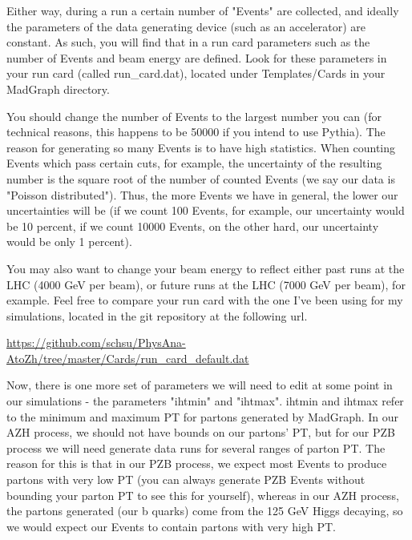 \documentclass{article}
\begin{document}
\bigskip

Either way, during a run a certain number of "Events" are collected, and ideally the parameters of the data generating device (such as
an accelerator) are constant. As such, you will find that in a run card parameters such as the number of Events and beam energy are defined.
Look for these parameters in your run card (called run\_card.dat), located under Templates/Cards in your MadGraph directory.

\bigskip

You should change the number of Events to the largest number you can (for technical reasons, this happens to be 50000 if you intend to use Pythia).
The reason for generating so many Events is to have high statistics. When counting Events which pass certain cuts, for example, the uncertainty of
the resulting number is the square root of the number of counted Events (we say our data is "Poisson distributed"). Thus, the more Events we have
in general, the lower our uncertainties will be (if we count 100 Events, for example, our uncertainty would be 10 percent, if we count 10000 Events,
on the other hard, our uncertainty would be only 1 percent).

\bigskip

You may also want to change your beam energy to reflect either past runs at the LHC (4000 GeV per beam), or future runs at the LHC (7000 GeV per beam), for example.
Feel free to compare your run card with the one I've been using for my simulations, located in the git repository at the following url.

\bigskip

\url{https://github.com/schsu/PhysAna-AtoZh/tree/master/Cards/run_card_default.dat}

\bigskip

Now, there is one more set of parameters we will need to edit at some point in our simulations - the parameters "ihtmin" and "ihtmax".
ihtmin and ihtmax refer to the minimum and maximum PT for partons generated by MadGraph. In our AZH process, we should not have bounds
on our partons' PT, but for our PZB process we will need generate data runs for several ranges of parton PT. The reason for this is
that in our PZB process, we expect most Events to produce partons with very low PT (you can always generate PZB Events without bounding
your parton PT to see this for yourself), whereas in our AZH process, the partons generated (our b quarks) come from the 125 GeV Higgs decaying,
so we would expect our Events to contain partons with very high PT.
\end{document}
